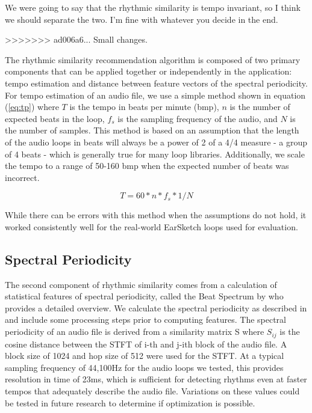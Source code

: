 \documentclass{article}
\begin{document}
We were going to say that the rhythmic similarity is tempo invariant, so I think we should separate the two. I'm fine with whatever you decide in the end.

>>>>>>> ad006a6... Small changes.

The rhythmic similarity recommendation algorithm is composed of two primary components that can be applied together or independently in the application: tempo estimation and distance between feature vectors of the spectral periodicity. For tempo estimation of an audio file, we use a simple method shown in equation (\ref{eq:tp}) where \(T\) is the tempo in beats per minute (bmp), \(n\) is the number of expected beats in the loop, \(f_s\) is the sampling frequency of the audio, and \(N\) is the number of samples. This method is based on an assumption that the length of the audio loops in beats will always be a power of 2 of a 4/4 measure - a group of 4 beats - which is generally true for many loop libraries. Additionally, we scale the tempo to a range of 50-160 bmp when the expected number of beats was incorrect.

\begin{equation}
\label{eq:tp}
T = 60 * n * f_s * 1/N
\end{equation}

While there can be errors with this method when the assumptions do not hold, it worked consistently well for the real-world EarSketch \cite{earsketch} loops used for evaluation.

\subsection{Spectral Periodicity}

The second component of rhythmic similarity comes from a calculation of statistical features of spectral periodicity, called the Beat Spectrum by \cite{foote2001beat} who provides a detailed overview. We calculate the spectral periodicity as described in \cite{foote2001beat} and include some processing steps prior to computing features. The spectral periodicity of an audio file is derived from a similarity matrix S where \(S_{ij}\) is the cosine distance between the STFT of i-th and j-ith block of the audio file. A block size of 1024 and hop size of 512 were used for the STFT. At a typical sampling frequency of 44,100Hz for the audio loops we tested, this provides resolution in time of 23ms, which is sufficient for detecting rhythms even at faster tempos that adequately describe the audio file. Variations on these values could be tested in future research to determine if optimization is possible.
\end{document}
